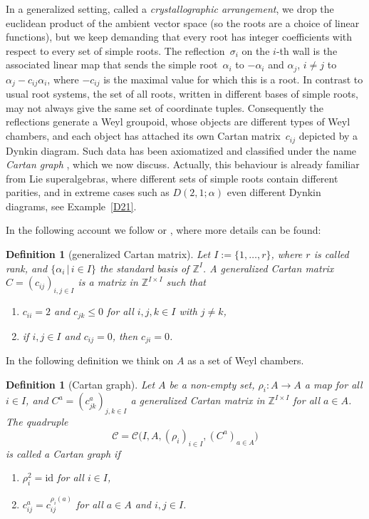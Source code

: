 \documentclass[pdftex]{sigma}%
\numberwithin{equation}{section}
\newtheorem{defin}[teo]{Definition}
\newcommand{\Z}{\mathbb{Z}}
\begin{document}
In a generalized setting, called a \emph{crystallographic arrangement}, we drop the euclidean product of the ambient vector space (so the roots are a choice of linear functions), but we keep demanding that every root has integer coefficients with respect to every set of simple roots. The reflection~$\sigma_i$ on the $i$-th wall is the associated linear map that sends the simple root~$\alpha_i$ to $-\alpha_i$ and $\alpha_j$, $i\neq j$ to $\alpha_j-c_{ij}\alpha_i$, where $-c_{ij}$ is the maximal value for which this is a root. In contrast to usual root systems, the set of all roots, written in different bases of simple roots, may not always give the same set of coordinate tuples. Consequently the reflections generate a Weyl groupoid, whose objects are different types of Weyl chambers, and each object has attached its own Cartan matrix~$c_{ij}$ depicted by a Dynkin diagram. Such data has been axiomatized and classified under the name \emph{Cartan graph} \cite{AHS10, Heck07, HS08, HY08}, which we now discuss.
Actually, this behaviour is already familiar from Lie superalgebras, where different sets of simple roots contain different parities, and in extreme cases such as $D(2,1;\alpha)$ even different Dynkin diagrams, see Example~\ref{D21}.

In the following account we follow \cite[Section~3.2]{Heck07} or \cite[Chapters~9,~10 and~15]{HS20}, where more details can be found:

\newcommand{\ZZ}{\Z}
\newcommand{\Cm}{C}
\newcommand{\cm}{c}
\newcommand{\rfl}{\rho}
\newcommand{\s}{\sigma}
\renewcommand{\r}{\mathrm{r}}
\newcommand{\Cc}{\mathcal{C}}
\newcommand{\Wg}{\mathcal{W}}
\newcommand{\re }{^\mathrm{re}}
\newcommand{\rer }[1]{(R\re)^{#1}}
\newcommand{\rsC }{\mathcal{R}}
\begin{defin}[generalized Cartan matrix]
	Let $I:=\{1,\dots,r\}$, where $r$ is called {\it rank}, and
	$\{\alpha_i\,|\,i\in I\}$ the standard basis of $\ZZ ^I$.
	A {\it generalized Cartan matrix}
	$\Cm =(\cm _{ij})_{i,j\in I}$
	is a matrix in $\ZZ ^{I\times I}$ such that
	\begin{enumerate}\itemsep=0pt
		\item[(M1)] $\cm _{ii}=2$ and $\cm _{jk}\le 0$ for all $i,j,k\in I$ with
		$j\not=k$,
		\item[(M2)] if $i,j\in I$ and $\cm _{ij}=0$, then $\cm _{ji}=0$.
	\end{enumerate}
\end{defin}
In the following definition we think on $A$ as a set of Weyl chambers.
\begin{defin}[Cartan graph]
	Let $A$ be a non-empty set, $\rfl _i\colon A \to A$ a map for all $i\in I$,
	and $\Cm ^a=(\cm ^a_{jk})_{j,k \in I}$ a generalized Cartan matrix
	in $\ZZ ^{I \times I}$ for all $a\in A$. The quadruple
	\[ \Cc = \Cc \big(I,A,(\rfl _i)_{i \in I}, (\Cm ^a)_{a \in A}\big)\]
	is called a \textit{Cartan graph} if
	\begin{enumerate}\itemsep=0pt
		\item[(C1)] $\rfl _i^2 = \mathrm{id}$ for all $i \in I$,
		\item[(C2)] $\cm ^a_{ij} = \cm ^{\rfl _i(a)}_{ij}$ for all $a\in A$ and
		$i,j\in I$.
	\end{enumerate}
\end{defin}
\end{document}
